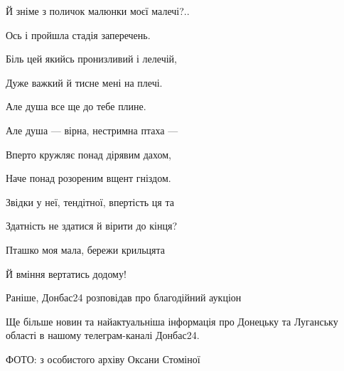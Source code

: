 Й зніме з поличок малюнки моєї малечі?..

Ось і пройшла стадія заперечень.

Біль цей якийсь пронизливий і лелечій,

Дуже важкий й тисне мені на плечі.

Але душа все ще до тебе плине.

Але душа — вірна, нестримна птаха —

Вперто кружляє понад дірявим дахом,

Наче понад розореним вщент гніздом.

Звідки у неї, тендітної, впертість ця та

Здатність не здатися й вірити до кінця?

Пташко моя мала, бережи крильцята

Й вміння вертатись додому!

Раніше, Донбас24 розповідав про благодійний аукціон

Ще більше новин та найактуальніша інформація про Донецьку та Луганську області в нашому телеграм-каналі Донбас24.

ФОТО: з особистого архіву Оксани Стоміної 
